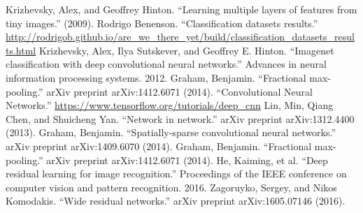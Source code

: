 \documentclass[conference]{IEEEtran}
\begin{document}
\begin{thebibliography}{00}
 Krizhevsky, Alex, and Geoffrey Hinton. ``Learning multiple layers of features from tiny images.'' (2009).
 Rodrigo Benenson. ``Classification datasets results.'' \url{http://rodrigob.github.io/are_we_there_yet/build/classification_datasets_results.html}
Krizhevsky, Alex, Ilya Sutskever, and Geoffrey E. Hinton. ``Imagenet classification with deep convolutional neural networks.'' Advances in neural information processing systems. 2012.
 Graham, Benjamin. ``Fractional max-pooling.'' arXiv preprint arXiv:1412.6071 (2014).
 ``Convolutional Neural Networks.'' \url{ https://www.tensorflow.org/tutorials/deep_cnn}
 Lin, Min, Qiang Chen, and Shuicheng Yan. ``Network in network.'' arXiv preprint arXiv:1312.4400 (2013).
 Graham, Benjamin. ``Spatially-sparse convolutional neural networks.'' arXiv preprint arXiv:1409.6070 (2014).
 Graham, Benjamin. ``Fractional max-pooling.'' arXiv preprint arXiv:1412.6071 (2014).
 He, Kaiming, et al. ``Deep residual learning for image recognition.'' Proceedings of the IEEE conference on computer vision and pattern recognition. 2016.
 Zagoruyko, Sergey, and Nikos Komodakis. ``Wide residual networks.'' arXiv preprint arXiv:1605.07146 (2016).
\end{thebibliography}
\end{document}
